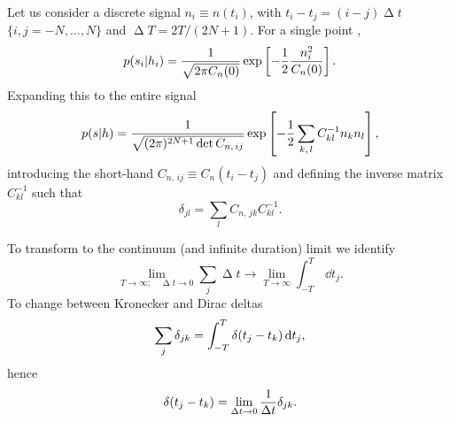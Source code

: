 Let us consider a discrete signal $n_i \equiv n(t_i)$, with $t_i - t_j = (i - j)\upDelta t$ $\{i,j = -N, \ldots, N\}$ and $\upDelta T = 2T/(2N + 1)$. For a single point \citep{Finn1992},
\begin{equation}
p(s_i|h_i) = \dfrac{1}{\sqrt{2\pi C_n(0)}} \exp\left[-\dfrac{1}{2} \dfrac{n_i^2}{C_n(0)}\right].
\end{equation}
Expanding this to the entire signal
\begin{equation}
p(s|h) = \dfrac{1}{\sqrt{(2\pi)^{2N+1} \det C_{n,\,ij}}} \exp\left[-\dfrac{1}{2} \sum_{k,\,l}C^{-1}_{kl}n_k n_l\right],
\label{eq:prod_prob}
\end{equation}
introducing the short-hand $C_{n,\,ij} \equiv C_n(t_i - t_j)$ and defining the inverse matrix $C^{-1}_{kl}$ such that
\begin{equation}
\delta_{jl} = \sum_l C_{n,\,jk}C^{-1}_{kl}.
\end{equation}

To transform to the continuum (and infinite duration) limit we identify
\begin{equation}
\lim_{T \rightarrow \infty; \quad \upDelta t \rightarrow 0} \sum_j \upDelta t \rightarrow \lim_{T \rightarrow \infty} \int_{-T}^{T}\,\dd t_j.
\end{equation}
To change between Kronecker and Dirac deltas
\begin{equation}
\sum_j \delta_{jk} = \int_{-T}^{T}{\delta(t_j - t_k)}\,\mathrm{d}{t_j},
\end{equation}
hence
\begin{equation}
\delta(t_j - t_k) = \lim_{\Delta t \rightarrow 0} \dfrac{1}{\Delta t} \delta_{jk}.
\end{equation}

